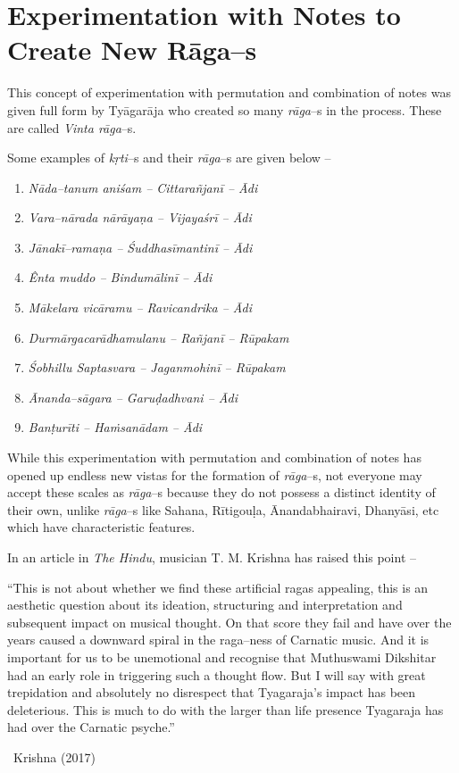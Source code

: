 \section*{Experimentation with Notes to Create New Rāga–s}

This concept of experimentation with permutation and combination of notes was given full form by Tyāgarāja who created so many \textit{rāga}–s in the process. These are called \textit{Vinta rāga}–s.

Some examples of \textit{kṛti}–s and their \textit{rāga}–s are given below –

\begin{enumerate}
\item \textit{Nāda–tanum aniśam – Cittarañjanī – Ādi}

 \item \textit{Vara–nārada nārāyaṇa – Vijayaśrī – Ādi}

 \item \textit{Jānakī–ramaṇa – Śuddhasīmantinī – Ādi} 

 \item \textit{Ênta muddo – Bindumālinī – Ādi}

 \item \textit{Mākelara vicāramu – Ravicandrika – Ādi}

 \item \textit{Durmārgacarādhamulanu – Rañjanī – Rūpakam}

 \item \textit{Śobhillu Saptasvara – Jaganmohinī – Rūpakam}

 \item \textit{Ānanda–sāgara – Garuḍadhvani – Ādi}

 \item \textit{Banṭurīti – Haṁsanādam – Ādi}

\end{enumerate}

While this experimentation with permutation and combination of notes has opened up endless new vistas for the formation of \textit{rāga}–s, not everyone may accept these scales as \textit{rāga}–s because they do not possess a distinct identity of their own, unlike \textit{rāga}–s like Sahana, Rītigouḷa, Ānandabhairavi, Dhanyāsi, etc which have characteristic features.

In an article in \textit{The Hindu}, musician T. M. Krishna has raised this point –

\begin{myquote}
“This is not about whether we find these artificial ragas appealing, this is an aesthetic question about its ideation, structuring and interpretation and subsequent impact on musical thought. On that score they fail and have over the years caused a downward spiral in the raga–ness of Carnatic music. And it is important for us to be unemotional and recognise that Muthuswami Dikshitar had an early role in triggering such a thought flow. But I will say with great trepidation and absolutely no disrespect that Tyagaraja’s impact has been deleterious. This is much to do with the larger than life presence Tyagaraja has had over the Carnatic psyche.” 

~\hfill Krishna (2017)
\end{myquote}

